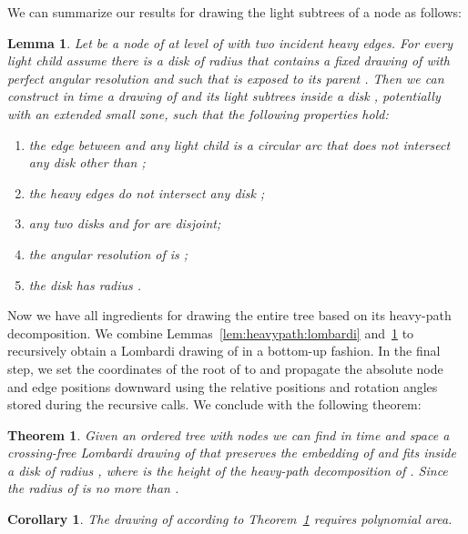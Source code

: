 \documentclass[11pt]{article}
\newtheorem{lemma}{Lemma}
\newtheorem{theorem}{Theorem}
\newtheorem{corollary}{Corollary}
\begin{document}
We can summarize our results for drawing the light subtrees of a node
as follows:

\begin{lemma}\label{lem:lom:lightchildren}
  Let  be a node of  at level  of  with two incident
  heavy edges. For every light child  assume there is a
  disk  of radius  that contains
  a fixed drawing of  with perfect angular resolution and such
  that  is exposed to its parent . Then we can
  construct in  time a drawing of  and its light subtrees inside a disk ,
  potentially with an extended small zone, such that the following
  properties hold:
  \begin{enumerate}
  \item\label{item:edge} the edge between  and any light child  is a circular arc that does not intersect any
    disk other than ;
  \item\label{item:heavyedge} the heavy edges do not intersect any disk ;
  \item\label{item:disks} any two disks  and  for  are disjoint;
  \item\label{item:angres} the angular resolution of  is ;
  \item\label{item:area} the disk  has radius .
  \end{enumerate}
\end{lemma}

Now we have all ingredients for drawing the entire tree  based on its heavy-path decomposition. We combine Lemmas~\ref{lem:heavypath:lombardi}
and~\ref{lem:lom:lightchildren} to recursively obtain a Lombardi drawing of  in a bottom-up fashion. In the final step, we set the coordinates of the root of  to  and propagate the absolute node and edge positions downward using the relative positions and rotation angles stored during the recursive calls. We conclude with the following theorem:

\begin{theorem}\label{thm:lombardi}
  Given an ordered tree  with  nodes we can find in  time and space a
  crossing-free Lombardi drawing of  that preserves the embedding
  of  and fits inside a disk  of radius , where 
  is the height of the heavy-path decomposition of . Since  the radius of  is no more than .
\end{theorem}

\begin{corollary}\label{cor:area-lombardi}
	The drawing of  according to Theorem~\ref{thm:lombardi} requires polynomial area.
\end{corollary}
\end{document}
